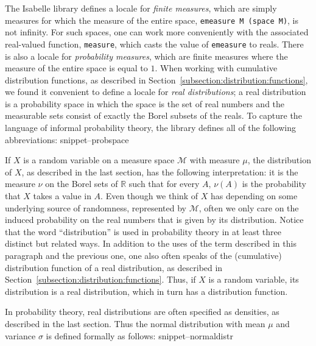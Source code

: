 \documentclass{svjour3}
\newcommand{\RR}{\mathbb{R}}
\newcommand{\mdl}[1]{{\mathcal #1}} %
\newcommand{\Snippet}[1]{\csname snippet--#1\endcsname}
\begin{document}
The Isabelle library defines a locale for \emph{finite measures}, which are simply measures for which the measure of the entire space, \texttt{emeasure M (space M)}, is not infinity. For such spaces, one can work more conveniently with the associated real-valued function, \texttt{measure}, which casts the value of \texttt{emeasure} to reals. There is also a locale for \emph{probability measures}, which are finite measures where the measure of the entire space is equal to $1$. When working with cumulative distribution functions, as described in Section~\ref{subsection:distribution:functions}, we found it convenient to define a locale for \emph{real distributions}; a real distribution is a probability space in which the space is the set of real numbers and the measurable sets consist of exactly the Borel subsets of the reals. To capture the language of informal probability theory, the library defines all of the following abbreviations:
\Snippet{probspace}

If $X$ is a random variable on a measure space $\mdl M$ with measure $\mu$, the distribution of $X$, as described in the last section, has the following interpretation: it is the measure $\nu$ on the Borel sets of $\RR$ such that for every $A$, $\nu(A)$ is the probability that $X$ takes a value in $A$. Even though we think of $X$ has depending on some underlying source of randomness, represented by $\mdl M$, often we only care on the induced probability on the real numbers that is given by its distribution. Notice that the word ``distribution'' is used in probability theory in at least three distinct but related ways. In addition to the uses of the term described in this paragraph and the previous one, one also often speaks of the (cumulative) distribution function of a real distribution, as described in Section~\ref{subsection:distribution:functions}. Thus, if $X$ is a random variable, its distribution is a real distribution, which in turn has a distribution function.

In probability theory, real distributions are often specified as densities, as described in the last section. Thus the normal distribution with mean $\mu$ and variance $\sigma$ is defined formally as follows:
\Snippet{normaldistr}
\end{document}

